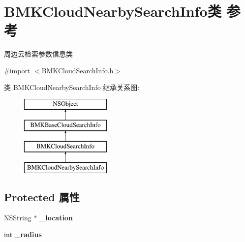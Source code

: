 \hypertarget{interface_b_m_k_cloud_nearby_search_info}{\section{B\+M\+K\+Cloud\+Nearby\+Search\+Info类 参考}
\label{interface_b_m_k_cloud_nearby_search_info}
}


周边云检索参数信息类  




{\ttfamily \#import $<$B\+M\+K\+Cloud\+Search\+Info.\+h$>$}

类 B\+M\+K\+Cloud\+Nearby\+Search\+Info 继承关系图\+:\begin{figure}[H]
\begin{center}
\leavevmode
\includegraphics[height=4.000000cm]{interface_b_m_k_cloud_nearby_search_info}
\end{center}
\end{figure}
\subsection*{Protected 属性}
\begin{DoxyCompactItemize}
\item 
\hypertarget{interface_b_m_k_cloud_nearby_search_info_a6a4cfe0d1809afeaa9f9fd78bb29ded3}{N\+S\+String $\ast$ {\bfseries \+\_\+location}}\label{interface_b_m_k_cloud_nearby_search_info_a6a4cfe0d1809afeaa9f9fd78bb29ded3}

\item 
\hypertarget{interface_b_m_k_cloud_nearby_search_info_a30c18210f666d7913e3f8d9c00161016}{int {\bfseries \+\_\+radius}}\label{interface_b_m_k_cloud_nearby_search_info_a30c18210f666d7913e3f8d9c00161016}

\end{DoxyCompactItemize}
